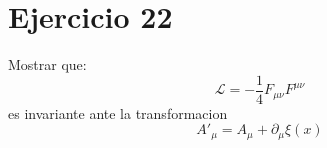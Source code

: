 \section*{Ejercicio 22}
Mostrar que:
\begin{equation*}
    \mathcal{L}=-\frac{1}{4} F_{\mu\nu}F^{\mu\nu}
\end{equation*}
es invariante ante la transformacion 
\begin{equation*}
    {A}'_\mu = A_\mu +\partial_\mu \xi(x)
\end{equation*}